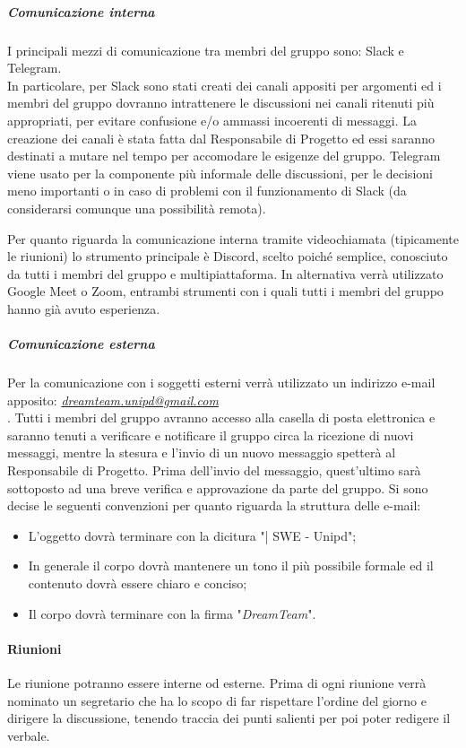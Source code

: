 \subparagraph{Comunicazione interna}
I principali mezzi di comunicazione tra membri del gruppo sono: Slack e Telegram. \\
In particolare, per Slack sono stati creati dei canali appositi per argomenti ed i membri del gruppo dovranno intrattenere le discussioni nei canali ritenuti più appropriati, per evitare confusione e/o ammassi incoerenti di messaggi. La creazione dei canali è stata fatta dal Responsabile di Progetto ed essi saranno destinati a mutare nel tempo per accomodare le esigenze del gruppo.
Telegram viene usato per la componente più informale delle discussioni, per le decisioni meno importanti o in caso di problemi con il funzionamento di Slack (da considerarsi comunque una possibilità remota). 

Per quanto riguarda la comunicazione interna tramite videochiamata (tipicamente le riunioni) lo strumento principale è Discord, scelto poiché semplice, conosciuto da tutti i membri del gruppo e multipiattaforma. In alternativa verrà utilizzato Google Meet o Zoom, entrambi strumenti con i quali tutti i membri del gruppo hanno già avuto esperienza.

\subparagraph{Comunicazione esterna}
Per la comunicazione con i soggetti esterni verrà utilizzato un indirizzo e-mail apposito: \textsl{\href{mailto:dreamteam.unipd@gmail.com}{dreamteam.unipd@gmail.com}} \\.
Tutti i membri del gruppo avranno accesso alla casella di posta elettronica e saranno tenuti a verificare e notificare il gruppo circa la ricezione di nuovi messaggi, mentre la stesura e l'invio di un nuovo messaggio spetterà al Responsabile di Progetto. Prima dell'invio del messaggio, quest'ultimo sarà sottoposto ad una breve verifica e approvazione da parte del gruppo.
Si sono decise le seguenti convenzioni per quanto riguarda la struttura delle e-mail:
\begin{itemize}
\item L'oggetto dovrà terminare con la dicitura "| SWE - Unipd";
\item In generale il corpo dovrà mantenere un tono il più possibile formale ed il contenuto dovrà essere chiaro e conciso;
\item Il corpo dovrà terminare con la firma "\textit{DreamTeam}".
\end{itemize}

\paragraph{Riunioni}
Le riunione potranno essere interne od esterne. Prima di ogni riunione verrà nominato un segretario che ha lo scopo di far rispettare l'ordine del giorno e dirigere la discussione, tenendo traccia dei punti salienti per poi poter redigere il verbale.

